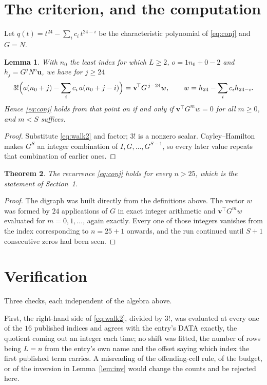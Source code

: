 \documentclass[11pt,a4paper]{article}
\theoremstyle{plain}
\newtheorem{theorem}{Theorem}
\newtheorem{lemma}[theorem]{Lemma}
\theoremstyle{definition}
\begin{document}
\section{The criterion, and the computation}

Let $q(t)=t^{24}-\sum_i c_i\,t^{24-i}$ be the characteristic polynomial of
\eqref{eq:conj} and $G=N$.

\begin{lemma}\label{lem:crit}
With $n_0$ the least index for which $L\ge2$, $o=1n_0+0-2$ and
$h_j=G^{j}N^{o}\mathbf{u}$, we have for $j\ge24$
\[
3!\Bigl(a(n_0+j)-\sum_i c_i\,a(n_0+j-i)\Bigr)=\mathbf{v}^{\!\top}G^{\,j-24}w,
\qquad w=h_{24}-\sum_i c_i h_{24-i} .
\]
Hence \eqref{eq:conj} holds from that point on if and only if
$\mathbf{v}^{\!\top}G^{m}w=0$ for all $m\ge0$, and $m<S$ suffices.
\end{lemma}

\begin{proof}
Substitute \eqref{eq:walk2} and factor; $3!$ is a nonzero scalar. Cayley--Hamilton
makes $G^{S}$ an integer combination of $I,G,\dots,G^{S-1}$, so every later value repeats
that combination of earlier ones.
\end{proof}

\begin{theorem}
The recurrence \eqref{eq:conj} holds for every $n>25$, which is the statement of
Section~1.
\end{theorem}

\begin{proof}
The digraph was built directly from the definitions above. The vector $w$ was formed by
$24$ applications of $G$ in exact integer arithmetic and $\mathbf{v}^{\!\top}G^{m}w$
evaluated for $m=0,1,\dots$, again exactly. Every one of those integers vanishes from the
index corresponding to $n=25+1$ onwards, and the run continued until $S+1$ consecutive
zeros had been seen.
\end{proof}

\section{Verification}

Three checks, each independent of the algebra above.

First, the right-hand side of \eqref{eq:walk2}, divided by $3!$, was evaluated at every
one of the $16$ published indices and agrees with the entry's DATA exactly, the quotient
coming out an integer each time; no shift was fitted, the number of rows being
$L=n$ from the entry's own name and the offset saying which index the first published
term carries. A misreading of the offending-cell rule, of the budget, or of the inversion in
Lemma~\ref{lem:inv} would change the counts and be rejected here.
\end{document}
